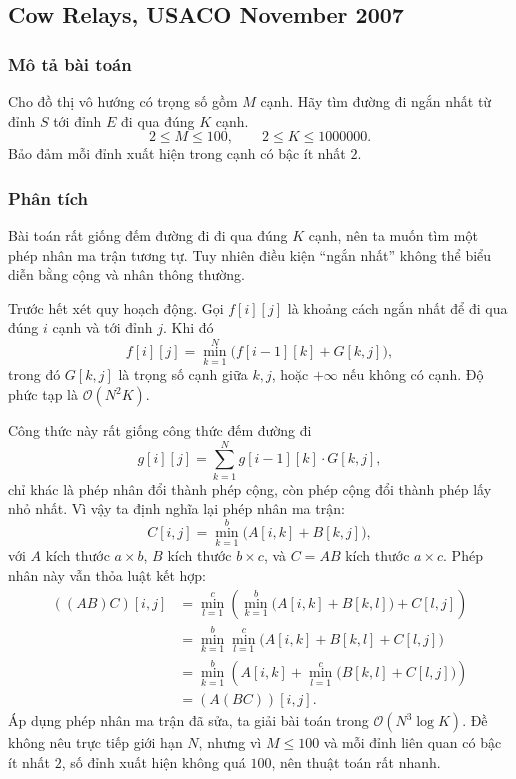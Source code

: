 \documentclass[11pt]{article}
\newcommand{\Oh}{\mathcal{O}}
\begin{document}
\subsection{Cow Relays, USACO November 2007}

\subsubsection{Mô tả bài toán}

Cho đồ thị vô hướng có trọng số gồm \(M\) cạnh. Hãy tìm đường đi ngắn nhất từ
đỉnh \(S\) tới đỉnh \(E\) đi qua đúng \(K\) cạnh.
\[
  2\le M\le 100,\qquad 2\le K\le 1000000.
\]
Bảo đảm mỗi đỉnh xuất hiện trong cạnh có bậc ít nhất \(2\).

\subsubsection{Phân tích}

Bài toán rất giống đếm đường đi đi qua đúng \(K\) cạnh, nên ta muốn tìm một
phép nhân ma trận tương tự. Tuy nhiên điều kiện ``ngắn nhất'' không thể biểu
diễn bằng cộng và nhân thông thường.

Trước hết xét quy hoạch động. Gọi \(f[i][j]\) là khoảng cách ngắn nhất để đi
qua đúng \(i\) cạnh và tới đỉnh \(j\). Khi đó
\[
  f[i][j]=\min_{k=1}^{N}\bigl(f[i-1][k]+G[k,j]\bigr),
\]
trong đó \(G[k,j]\) là trọng số cạnh giữa \(k,j\), hoặc \(+\infty\) nếu không
có cạnh. Độ phức tạp là \(\Oh(N^2K)\).

Công thức này rất giống công thức đếm đường đi
\[
  g[i][j]=\sum_{k=1}^{N}g[i-1][k]\cdot G[k,j],
\]
chỉ khác là phép nhân đổi thành phép cộng, còn phép cộng đổi thành phép lấy
nhỏ nhất. Vì vậy ta định nghĩa lại phép nhân ma trận:
\[
  C[i,j]=\min_{k=1}^{b}\bigl(A[i,k]+B[k,j]\bigr),
\]
với \(A\) kích thước \(a\times b\), \(B\) kích thước \(b\times c\), và
\(C=AB\) kích thước \(a\times c\). Phép nhân này vẫn thỏa luật kết hợp:
\[
\begin{aligned}
  ((AB)C)[i,j]
  &=\min_{l=1}^{c}\left(
      \min_{k=1}^{b}\bigl(A[i,k]+B[k,l]\bigr)+C[l,j]\right)\\
  &=\min_{k=1}^{b}\min_{l=1}^{c}
      \bigl(A[i,k]+B[k,l]+C[l,j]\bigr)\\
  &=\min_{k=1}^{b}\left(A[i,k]+
      \min_{l=1}^{c}\bigl(B[k,l]+C[l,j]\bigr)\right)\\
  &=(A(BC))[i,j].
\end{aligned}
\]
Áp dụng phép nhân ma trận đã sửa, ta giải bài toán trong \(\Oh(N^3\log K)\).
Đề không nêu trực tiếp giới hạn \(N\), nhưng vì \(M\le 100\) và mỗi đỉnh liên
quan có bậc ít nhất \(2\), số đỉnh xuất hiện không quá \(100\), nên thuật toán
rất nhanh.
\end{document}
